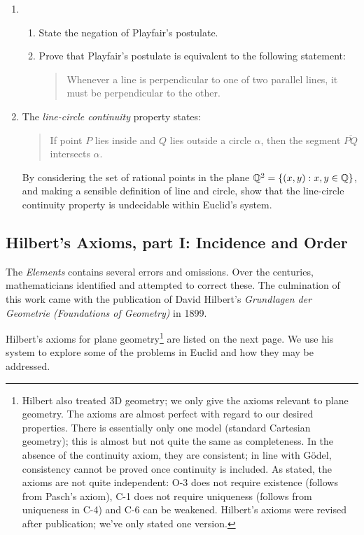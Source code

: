 \begin{exercises}
\begin{enumerate}
  
  \item\begin{enumerate}
    \item State the negation of Playfair's postulate.
    \item Prove that Playfair's postulate is equivalent to the following statement:
  \begin{quote}
  	Whenever a line is perpendicular to one of two parallel lines, it must be perpendicular to the other.
  \end{quote}
  \end{enumerate}
 
  
    
  \item\label{ex:euclidundecideable} The \emph{line-circle continuity} property states:
  \begin{quote}
  If point $P$ lies inside and $Q$ lies outside a circle $\alpha$, then the segment $\overline{PQ}$ intersects $\alpha$.
  \end{quote}
  By considering the set of rational points in the plane $\mathbb{Q}^2=\{(x,y):x,y\in\mathbb{Q}\}$, and making a sensible definition of line and circle, show that the line-circle continuity property is undecidable within Euclid's system.
\end{enumerate}
\end{exercises}

\clearpage



\subsection{Hilbert's Axioms, part I: Incidence and Order}\label{sec:hilbert1}

The \emph{Elements} contains several errors and omissions. Over the centuries, mathematicians identified and attempted to correct these. The culmination of this work came with the publication of David Hilbert's \emph{Grundlagen der Geometrie (Foundations of Geometry)} in 1899.\smallbreak


Hilbert's axioms for plane geometry\footnote{Hilbert also treated 3D geometry; we only give the axioms relevant to plane geometry. The axioms are almost perfect with regard to our desired properties. There is essentially only one model (standard Cartesian geometry); this is almost but not quite the same as completeness. In the absence of the continuity axiom, they are consistent; in line with Gödel, consistency cannot be proved once continuity is included. As stated, the axioms are not quite independent: O-3 does not require existence (follows from Pasch's axiom), C-1 does not require uniqueness (follows from uniqueness in C-4) and C-6 can be weakened. Hilbert's axioms were revised after publication; we've only stated one version.} are listed on the next page. We use his system to explore some of the problems in Euclid and how they may be addressed.\smallbreak


